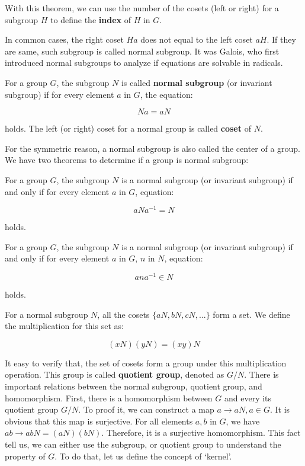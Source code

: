 \documentclass{article}
\begin{document}
With this theorem, we can use the number of the cosets (left or right) for a subgroup $H$ to define the \textbf{index} of $H$ in $G$.

In common cases, the right coset $Ha$ does not equal to the left coset $aH$. If they are same, such subgroup is called normal subgroup. It was Galois, who first introduced normal subgroups to analyze if equations are solvable in radicals.

 
\begin{definition}
For a group $G$, the subgroup $N$ is called \textbf{normal subgroup} (or invariant subgroup) if for every element $a$ in $G$, the equation:

\[
Na = aN
\]

holds. The left (or right) coset for a normal group is called \textbf{coset} of $N$.
\label{normal-subgroup}
\end{definition}

For the symmetric reason, a normal subgroup is also called the center of a group. We have two theorems to determine if a group is normal subgroup:

\begin{theorem}
For a group $G$, the subgroup $N$ is a normal subgroup (or invariant subgroup) if and only if for every element $a$ in $G$, equation:

\[
aNa^{-1} = N
\]

holds.
\end{theorem}

\begin{theorem}
For a group $G$, the subgroup $N$ is a normal subgroup (or invariant subgroup) if and only if for every element $a$ in $G$, $n$ in $N$, equation:

\[
ana^{-1} \in N
\]

holds.
\end{theorem}

For a normal subgroup $N$, all the cosets $\{aN, bN, cN, ...\}$ form a set. We define the multiplication for this set as:

\[
(xN)(yN) = (xy)N
\]

It easy to verify that, the set of cosets form a group under this multiplication operation. This group is called \textbf{quotient group}, denoted as $G/N$. There is important relations between the normal subgroup, quotient group, and homomorphism. First, there is a homomorphism between $G$ and every its quotient group $G/N$. To proof it, we can construct a map $a \to aN, a \in G$. It is obvious that this map is surjective. For all elements $a, b$ in $G$, we have $ab \to abN = (aN)(bN)$. Therefore, it is a surjective homomorphism. This fact tell us, we can either use the subgroup, or quotient group to understand the property of $G$. To do that, let us define the concept of `kernel'.
\end{document}
